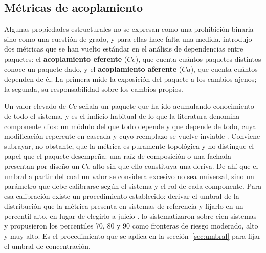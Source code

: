 \subsection{Métricas de acoplamiento}
Algunas propiedades estructurales no se expresan como una prohibición binaria sino como una cuestión de grado, y para ellas hace falta una medida. \citet{Martin2003} introdujo dos métricas que se han vuelto estándar en el análisis de dependencias entre paquetes: el \textbf{acoplamiento eferente} ($Ce$), que cuenta cuántos paquetes distintos conoce un paquete dado, y el \textbf{acoplamiento aferente} ($Ca$), que cuenta cuántos dependen de él. La primera mide la exposición del paquete a los cambios ajenos; la segunda, su responsabilidad sobre los cambios propios.

Un valor elevado de $Ce$ señala un paquete que ha ido acumulando conocimiento de todo el sistema, y es el indicio habitual de lo que la literatura denomina componente dios: un módulo del que todo depende y que depende de todo, cuya modificación repercute en cascada y cuyo reemplazo se vuelve inviable \citep{SasAvgeriou}. Conviene subrayar, no obstante, que la métrica es puramente topológica y no distingue el papel que el paquete desempeña: una raíz de composición o una fachada presentan por diseño un $Ce$ alto sin que ello constituya una deriva. De ahí que el umbral a partir del cual un valor se considera excesivo no sea universal, sino un parámetro que debe calibrarse según el sistema y el rol de cada componente. Para esa calibración existe un procedimiento establecido: derivar el umbral de la distribución que la métrica presenta en sistemas de referencia y fijarlo en un percentil alto, en lugar de elegirlo a juicio \citep{LanzaMarinescu2006}. \citet{Alves2010} lo sistematizaron sobre cien sistemas y propusieron los percentiles 70, 80 y 90 como fronteras de riesgo moderado, alto y muy alto. Es el procedimiento que se aplica en la sección~\ref{sec:umbral} para fijar el umbral de concentración.

